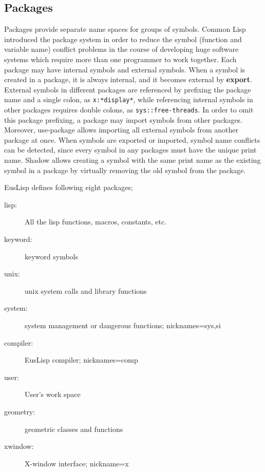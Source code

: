 \begin{refdesc}

\end{refdesc}

\subsection{Packages}

Packages provide separate name spaces for groups of symbols.
Common Lisp introduced the package system in order to reduce the
symbol (function and variable name) conflict problems 
in the course of developing huge software systems
which require more than one programmer to work together.
Each package may have internal symbols and external symbols.
When a symbol is created in a package, it is always internal,
and it becomes external by {\bf export}. External symbols in different
packages are referenced by prefixing the package name and a single colon,
as {\tt x:*display*}, while referencing internal symbols in other packages
requires double colons, as {\tt sys::free-threads}.
In order to omit this package prefixing, a package may {\bfx import} symbols
from other packages.
Moreover, {\bfx use-package} allows importing all external symbols
from another package at once.
When symbols are exported or imported, symbol name conflicts can be detected,
since every symbol in any packages must have the unique print name.
{\bfx Shadow} allows creating a symbol with the same print name as the
existing symbol in a package by virtually removing the old symbol from 
the package.

EusLisp defines following eight packages;
\begin{description}
\item [lisp:] All the lisp functions, macros, constants, etc.
\item [keyword:] keyword symbols 
\item [unix:] unix system calls and library functions
\item [system:] system management or dangerous functions; nicknames=sys,si
\item [compiler:] EusLisp compiler; nicknames=comp
\item [user:] User's work space
\item [geometry:] geometric classes and functions
\item [xwindow:] X-window interface; nickname=x
\end{description}

